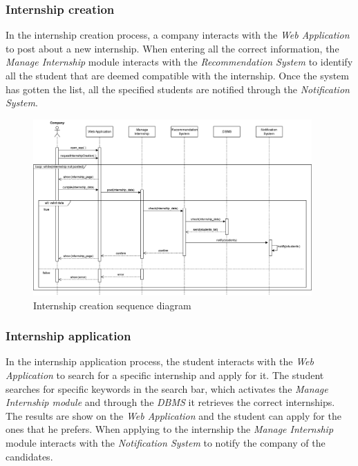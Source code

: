 \documentclass[11pt,twoside]{article}
\begin{document}
\newpage

		\subsubsection{Internship creation}
In the internship creation process, a company interacts with the \textit{Web Application} to post about a new internship. When entering all the correct information, the \textit{Manage Internship} module interacts with the \textit{Recommendation System} to identify all the student that are deemed compatible with the internship. Once the system has gotten the list, all the specified students are notified through the \textit{Notification System}.

\begin{figure}[H]
\centering
\includegraphics[width=0.95\textwidth]{Images/Seq3}
\caption{Internship creation sequence diagram}\label{Seq3}
\end{figure}

\newpage

		\subsubsection{Internship application}
In the internship application process, the student interacts with the \textit{Web Application} to search for a specific internship and apply for it. The student searches for specific keywords in the search bar, which activates the \textit{Manage Internship module} and through the \textit{DBMS} it retrieves the correct internships. The results are show on the \textit{Web Application} and the student can apply for the ones that he prefers. When applying to the internship the \textit{Manage Internship} module interacts with the \textit{Notification System} to notify the company of the candidates.
\end{document}
